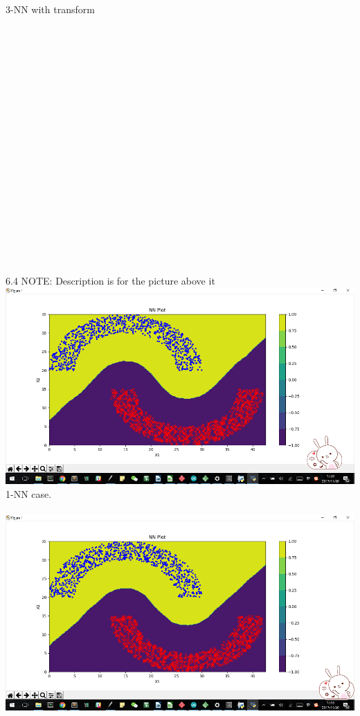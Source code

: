 \documentclass[12pt]{article}
\begin{document}
3-NN with transform\\\\\\\\\\\\\\\\\\\\\\\\\\\\\\\\\\\\\\\\
6.4 NOTE: Description is for the picture above it\\%
\includegraphics[scale=0.9]{images/6_4_1nn}\\
1-NN case. \\\\
\includegraphics[scale=0.9]{images/6_4_3nn}\\
\end{document}
